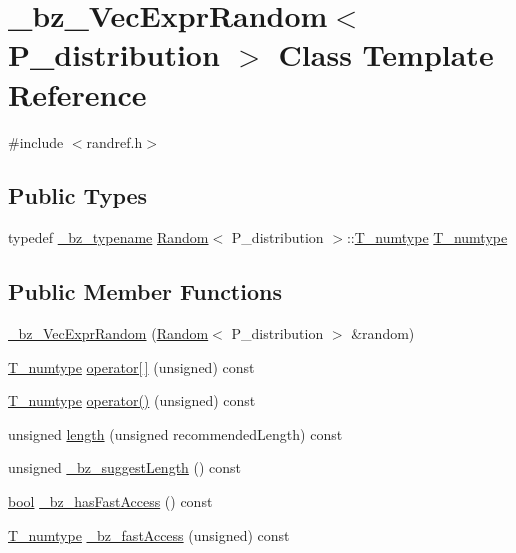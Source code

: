 \hypertarget{class__bz__VecExprRandom}{}\section{\+\_\+bz\+\_\+\+Vec\+Expr\+Random$<$ P\+\_\+distribution $>$ Class Template Reference}
\label{class__bz__VecExprRandom}


{\ttfamily \#include $<$randref.\+h$>$}

\subsection*{Public Types}
\begin{DoxyCompactItemize}
\item 
typedef \hyperlink{compiler_8h_a1bc40add3e72effc9cf69dbe445cbdfd}{\+\_\+bz\+\_\+typename} \hyperlink{classRandom}{Random}$<$ P\+\_\+distribution $>$\+::\hyperlink{class__bz__VecExprRandom_a68331a2b705d4a1386e832b3048085c2}{T\+\_\+numtype} \hyperlink{class__bz__VecExprRandom_a68331a2b705d4a1386e832b3048085c2}{T\+\_\+numtype}
\end{DoxyCompactItemize}
\subsection*{Public Member Functions}
\begin{DoxyCompactItemize}
\item 
\hyperlink{class__bz__VecExprRandom_ae8052c596726d71bcf534fe36fa0a9e5}{\+\_\+bz\+\_\+\+Vec\+Expr\+Random} (\hyperlink{classRandom}{Random}$<$ P\+\_\+distribution $>$ \&random)
\item 
\hyperlink{class__bz__VecExprRandom_a68331a2b705d4a1386e832b3048085c2}{T\+\_\+numtype} \hyperlink{class__bz__VecExprRandom_ae073be089a5091a29dc1b71ec8e0bc96}{operator\mbox{[}$\,$\mbox{]}} (unsigned) const 
\item 
\hyperlink{class__bz__VecExprRandom_a68331a2b705d4a1386e832b3048085c2}{T\+\_\+numtype} \hyperlink{class__bz__VecExprRandom_a28b8583b2ab2cdbf04ce0678eda2420a}{operator()} (unsigned) const 
\item 
unsigned \hyperlink{class__bz__VecExprRandom_ad0949245d3e5438effb4b149d6949f5c}{length} (unsigned recommended\+Length) const 
\item 
unsigned \hyperlink{class__bz__VecExprRandom_a6d763d55ffb670cc614f830bec7611bd}{\+\_\+bz\+\_\+suggest\+Length} () const 
\item 
\hyperlink{compiler_8h_abb452686968e48b67397da5f97445f5b}{bool} \hyperlink{class__bz__VecExprRandom_a2424b871a468290b202557c2690067c6}{\+\_\+bz\+\_\+has\+Fast\+Access} () const 
\item 
\hyperlink{class__bz__VecExprRandom_a68331a2b705d4a1386e832b3048085c2}{T\+\_\+numtype} \hyperlink{class__bz__VecExprRandom_ae4ff016d48e446823f5c69f0aaa8421b}{\+\_\+bz\+\_\+fast\+Access} (unsigned) const 
\end{DoxyCompactItemize}


